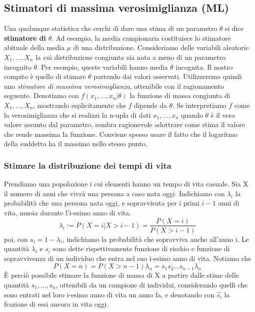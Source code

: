 \documentclass[11pt]{article}
\begin{document}
\subsection{Stimatori di massima verosimiglianza (ML)}
Una qualunque statistica che cerchi di dare una stima di un parametro $\theta$ si dice \textbf{stimatore di $\theta$}. Ad esempio, la media campionaria costituisce lo stimatore abituale della media $\mu$ di una distribuzione. Consideriamo delle variabili aleatorie $X_1,...,X_n$ la cui distribuzione congiunta sia nota a meno di un parametro incognito $\theta$. Per esempio, queste variabili hanno media $\theta$ incognita. Il nostro compito è quello di stimare $\theta$ partendo dai valori osservati. Utilizzeremo quindi uno \textit{stimatore di massima verosimiglianza}, ottenibile con il ragionamento seguente. Denotiamo con $f(x_1,...,x_n|\theta)$ la funzione di massa congiunta di $X_1,...,X_n$, mostrando esplicitamente che $f$ dipende da $\theta$. Se interpretiamo $f$ come la verosimiglianza che si realizzi la n-upla di dati $x_1,...,x_n$ quando $\theta$ è il vero valore assunto dal parametro, sembra ragionevole adottrare come stima il valore che rende massima la funzione. Conviene spesso usare il fatto che il logaritmo della suddetta ha il massimo nello stesso punto. 
\subsubsection{Stimare la distribuzione dei tempi di vita}
Prendiamo una popolazione i cui elementi hanno un tempo di vita casuale. Sia X il numero di anni che vivrà una persona a caso nata oggi. Indichiamo con $\lambda_i$ la probabilità che una persona nata oggi, e sopravvisuta per i primi $i-1$ anni di vita, muoia durante l'i-esimo anno di vita. 
\begin{displaymath}
    \lambda_i:=P(X=i|X>i-1)=\frac{P(X=i)}{P(X>i-1)}
\end{displaymath}
poi, con $s_i=1-\lambda_i$, indichiamo la probabilità che sopravviva anche all'anno i. Le quantità $\lambda_i$ e $s_i$ sono dette rispettivamente funzione di rischio e funzione di sopravvivenza di un individuo che entra nel suo i-esimo anno di vita. 
Notiamo che 
\begin{displaymath}
    P(X=n) = P(X>n-1)\lambda_n = s_1s_2...s_{n-1}\lambda_n
\end{displaymath}
È perciò possibile stimare la funzione di massa di X a partire dalle stime delle quantità $s_1,...,s_n$, ottenibili da un campione di individui, considerando quelli che sono entrati nel loro i-esimo anno di vita un anno fa, e denotando con $\hat{s_i}$ la frazione di essi ancora in vita oggi.
\end{document}
